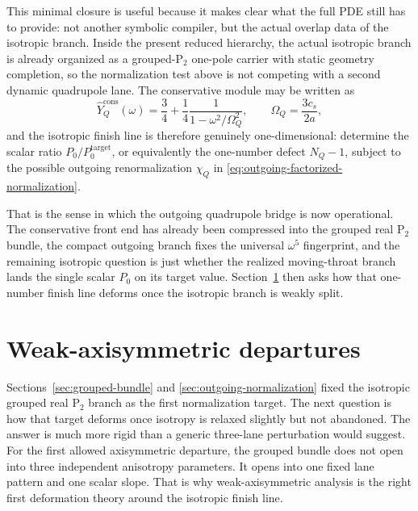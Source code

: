 \documentclass[11pt]{article}
\theoremstyle{definition}
\newcommand{\Ptwo}{\ensuremath{\mathrm{P}_2}}
\begin{document}
This minimal closure is useful because it makes clear what the full PDE still has to provide: not another symbolic compiler, but the actual overlap data of the isotropic branch. Inside the present reduced hierarchy, the actual isotropic branch is already organized as a grouped-$\Ptwo$ one-pole carrier with static geometry completion, so the normalization test above is not competing with a second dynamic quadrupole lane. The conservative module may be written as
\begin{equation}
\widehat Y_Q^{\mathrm{cons}}(\omega)=\frac34+\frac14\frac{1}{1-\omega^2/\Omega_Q^2},
\qquad
\Omega_Q=\frac{3c_s}{2a},
\label{eq:outgoing-actual-one-pole-branch}
\end{equation}
and the isotropic finish line is therefore genuinely one-dimensional: determine the scalar ratio $P_0/P_0^{\mathrm{target}}$, or equivalently the one-number defect $N_Q-1$, subject to the possible outgoing renormalization $\chi_Q$ in \eqref{eq:outgoing-factorized-normalization}.

That is the sense in which the outgoing quadrupole bridge is now operational. The conservative front end has already been compressed into the grouped real $\Ptwo$ bundle, the compact outgoing branch fixes the universal $\omega^5$ fingerprint, and the remaining isotropic question is just whether the realized moving-throat branch lands the single scalar $P_0$ on its target value. Section~\ref{sec:weak-axisymmetry} then asks how that one-number finish line deforms once the isotropic branch is weakly split.

\section{Weak-axisymmetric departures}
\label{sec:weak-axisymmetry}

Sections~\ref{sec:grouped-bundle} and \ref{sec:outgoing-normalization} fixed the isotropic grouped real $\Ptwo$ branch as the first normalization target. The next question is how that target deforms once isotropy is relaxed slightly but not abandoned. The answer is much more rigid than a generic three-lane perturbation would suggest. For the first allowed axisymmetric departure, the grouped bundle does not open into three independent anisotropy parameters. It opens into one fixed lane pattern and one scalar slope. That is why weak-axisymmetric analysis is the right first deformation theory around the isotropic finish line.
\end{document}
